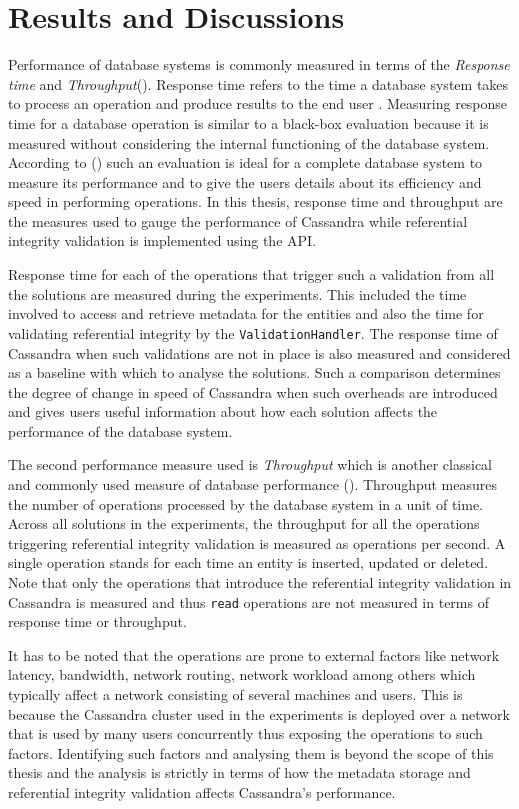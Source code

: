 \chapter{Results and Discussions}
Performance of database systems is commonly measured in terms of the
\textit{Response time} and \textit{Throughput}().
Response time refers to the time  a database system takes to process an
operation and produce results to the end user . Measuring response time for a
database operation is similar to a black-box evaluation because it is measured 
without considering the internal functioning  of the database system. According
to () such an evaluation is ideal for a complete database
system to measure its performance and to give the users details about its 
efficiency and speed in performing operations. In this thesis, response time and
throughput are the measures used to gauge the performance of Cassandra
while referential integrity validation is implemented using the \ac{API}.

Response time for each of the  operations that trigger such a validation from
all the solutions are measured during the experiments. This included the
time involved to access and retrieve metadata for the entities and also the time for
validating referential integrity by the \texttt{ValidationHandler}. The response
time of Cassandra when such validations are not in place is also measured and considered as a
baseline with which to analyse the solutions. Such a comparison  determines the degree of
change in speed of Cassandra when such overheads are introduced and gives 
users useful information about how each solution affects the performance of
the database system.

The second performance measure used is \textit{Throughput} which
is another classical and commonly used measure of database performance
().
Throughput measures the number of operations processed by the database system in a unit of
time. Across all solutions in the experiments, the throughput for all the
operations triggering referential integrity validation  is measured
as operations per second.
A single operation stands for each time an entity is inserted, updated or
deleted. Note that only the operations that
introduce the referential integrity validation in Cassandra is measured and thus
\texttt{read} operations are not measured in terms of response time or
throughput.

It has to be noted that the operations are prone to  external factors like
network latency, bandwidth, network routing, network workload among others which
typically affect a network consisting of several machines and users. This is
because the Cassandra cluster used in the experiments is deployed over a
network that is used by many users concurrently thus exposing the operations to
such factors. Identifying such factors and analysing them is beyond the scope of
this thesis and the analysis is strictly in terms of how the metadata storage
and referential integrity validation affects Cassandra's performance.

